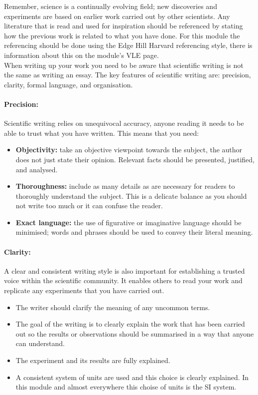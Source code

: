 \documentclass[a4paper,12pt]{book}
\begin{document}
Remember, science is a continually evolving field; new discoveries and experiments are based on earlier work carried out by other scientists. Any literature that is read and used for inspiration should be referenced by stating how the previous work is related to what you have done. For this module the referencing should be done using the Edge Hill Harvard referencing style, there is information about this on the module's VLE page. \\

When writing up your work you need to be aware that scientific writing is not the same as writing an essay. The key features of scientific writing are: precision, clarity, formal language, and organisation. 

\paragraph{Precision:} Scientific writing relies on unequivocal accuracy, anyone reading it needs to be able to trust what you have written. This means that you need:
\begin{itemize}
\setlength{\itemsep}{-5pt}
    \item \textbf{Objectivity:} take an objective viewpoint towards the subject, the author does not just state their opinion. Relevant facts should be presented, justified, and analysed.
    \item \textbf{Thoroughness:} include as many details as are necessary for readers to thoroughly understand the subject. This is a delicate balance as you should not write too much or it can confuse the reader.
    \item \textbf{Exact language:} the use of figurative or imaginative language should be minimised; words and phrases should be used to convey their literal meaning.
\end{itemize}

\paragraph{Clarity:}A clear and consistent writing style is also important for establishing a trusted voice within the scientific community. It enables others to read your work and replicate any experiments that you have carried out.
\begin{itemize}
\setlength{\itemsep}{-5pt}
    \item The writer should clarify the meaning of any uncommon terms.
    \item The goal of the writing is to clearly explain the work that has been carried out so the results or observations should be summarised in a way that anyone can understand.
    \item The experiment and its results are fully explained.
    \item A consistent system of units are used and this choice is clearly explained. In this module and almost everywhere this choise of units is the SI system.
\end{itemize}
\end{document}
